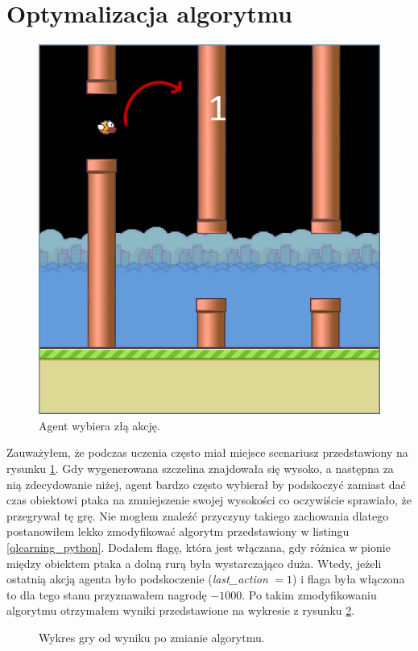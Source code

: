 \documentclass[a4paper, 12pt,twoside]{report}
\begin{document}
\section{Optymalizacja algorytmu}
\begin{figure}[!htb] 
	\begin{center}
		\includegraphics[scale=0.45]{agent_top_pipe_penalty.png}
	\end{center}
	\caption{Agent wybiera złą akcję.}
	\label{agent_top_pipe}
\end{figure}

Zauważyłem, że podczas uczenia często miał miejsce scenariusz przedstawiony na
rysunku \ref{agent_top_pipe}.
Gdy wygenerowana szczelina znajdowała się wysoko, a następna za nią
zdecydowanie niżej, agent bardzo często wybierał by podskoczyć zamiast dać czas
obiektowi ptaka na zmniejszenie swojej wysokości co oczywiście sprawiało,
że przegrywał tę grę. Nie mogłem znaleźć przyczyny takiego zachowania dlatego
postanowiłem lekko zmodyfikować algorytm przedstawiony w listingu
\ref{qlearning_python}. Dodałem flagę, która jest włączana, gdy różnica w
pionie między obiektem ptaka a dolną rurą była wystarczająco duża. Wtedy,
jeżeli ostatnią akcją agenta było podskoczenie (\textit{last\_action}
$=1$) i flaga była włączona to dla tego stanu przyznawałem nagrodę $-1000$. Po
takim zmodyfikowaniu algorytmu otrzymałem wyniki przedstawione na wykresie z
rysunku \ref{plot_top_pipe_penalty}.
\begin{figure}[!htb]
	\begin{center}
		
	\end{center}
	\caption{Wykres gry od wyniku po zmianie algorytmu.}
	\label{plot_top_pipe_penalty}
\end{figure}
\end{document}
